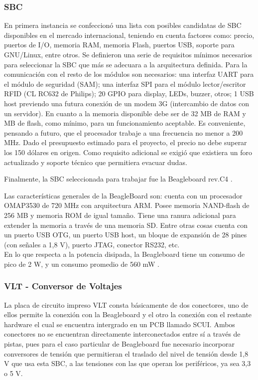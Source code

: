 \documentclass[%
        final,
        notitlepage,
        narroweqnarray,
        inline,
        ]{ieee}
\begin{document}
\subsubsection{SBC}
En primera instancia se confeccionó una lista con posibles candidatas de SBC disponibles
en el mercado internacional, teniendo en cuenta factores como: precio, puertos de I/O, memoria RAM, memoria Flash, puertos USB, soporte para GNU/Linux, entre otros.
Se definieron una serie de requisitos mínimos necesarios para seleccionar la SBC que más se adecuara a la arquitectura definida.
Para la comunicación con el resto de los módulos son necesarios: una interfaz UART para el módulo de seguridad (SAM); una interfaz SPI para el módulo lector/escritor RFID (CL RC632 de Philips); 20 GPIO para display, LEDs, buzzer, otros; 1 USB host previendo una futura conexión de un modem 3G (intercambio de datos con un servidor). En cuanto a la memoria disponible debe ser de 32 MB de RAM y  MB de flash,  como mínimo, para un funcionamiento aceptable. Es conveniente, pensando a futuro, que el procesador trabaje a una frecuencia no menor a 200 MHz.
Dado el presupuesto estimado para el proyecto, el precio no debe superar los 150 dólares en origen.
Como requisito adicional se exigió que existiera un foro actualizado y soporte técnico que permitiera evacuar dudas.

Finalmente, la SBC seleccionada para trabajar fue la Beagleboard rev.C4 \cite{Beagle}.

Las características generales de la BeagleBoard son: cuenta con un procesador OMAP3530 de 720 MHz con arquitectura ARM. Posee  memoria NAND-flash de 256 MB y memoria ROM de igual tamaño. Tiene una ranura adicional para extender la memoria a través de una memoria SD. Entre otras cosas cuenta con un puerto USB OTG, un puerto USB host, un bloque de expansión de 28 pines (con señales a 1,8 V), puerto JTAG, conector RS232, etc.\\
En lo que respecta a la potencia disipada, la Beagleboard tiene un consumo de pico de 2 W, y un consumo promedio de 560 mW \cite{consumo1} \cite{consumo2}.

\subsubsection{VLT - Conversor de Voltajes}
La placa de circuito impreso VLT consta básicamente de dos conectores, uno de ellos permite la conexión con la Beagleboard y el otro la conexión con el restante hardware el cual se encuentra intergrado en un PCB llamado SCUI. Ambos conectores no se encuentran directamente interconectados entre sí a través de pistas, pues para el caso particular de Beagleboard fue necesario incorporar conversores de tensión que permitieran el traslado del nivel de tensión desde 1,8 V que usa esta SBC, a las tensiones con las que operan los periféricos, ya sea 3,3 o 5 V.
\end{document}
